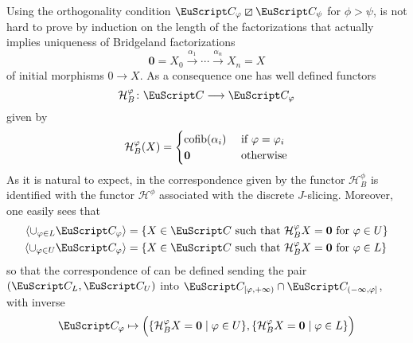 \begin{remark}\label{rem:b-is-discrete}
Using the orthogonality condition $\C_\phi\orth\C_\psi$ for $\phi>\psi$,  is not hard to prove by induction on the length of the factorizations that \adef{} actually implies uniqueness of Bridgeland factorizations 
\[\mathbf{0}=X_0 \xrightarrow{\alpha_1} \cdots \xrightarrow{\alpha_n} X_n=X\]
of initial morphisms $0\to X$. As a consequence one has well defined functors
\[
\mathcal{H}^\phi_B\colon \C \to \C_\phi
\]
given by 
\[
\mathcal{H}^\varphi_B(X)=\begin{cases}
\operatorname{cofib}(\alpha_i) &\text{ if $\varphi=\varphi_i$}
\\
\mathbf{0}&\text{ otherwise}
\end{cases}
\]
As it is natural to expect, in the correspondence given by \aprop{} the functor $\mathcal{H}^\phi_B$ is identified with the functor $\mathcal{H}^\phi$ associated with the discrete $J$-slicing. Moreover, one easily sees that 
\begin{align*}
\langle \cup_{\phi\in L}\C_\phi \rangle&=\{X\in \C \text{ such that }\mathcal{H}_B^\phi X=\mathbf{0} \text{ for } \phi\in U\}\\
\langle \cup_{\phi\in U}\C_\phi \rangle&=\{X\in \C \text{ such that }\mathcal{H}_B^\phi X=\mathbf{0} \text{ for } \phi\in L\}
\end{align*}
so that the correspondence of \aprop{} can be defined sending the pair $(\C_L,\C_U)$ into $\C_{[\phi,+\infty)}\cap \C_{(-\infty,\phi]}$, with inverse
\[
\C_\varphi \mapsto \Big(\{\mathcal{H}_B^\phi X=\mathbf{0} \mid \phi\in U\},\{\mathcal{H}_B^\phi X=\mathbf{0}\mid \phi\in L\}\Big)
\]
\end{remark}






